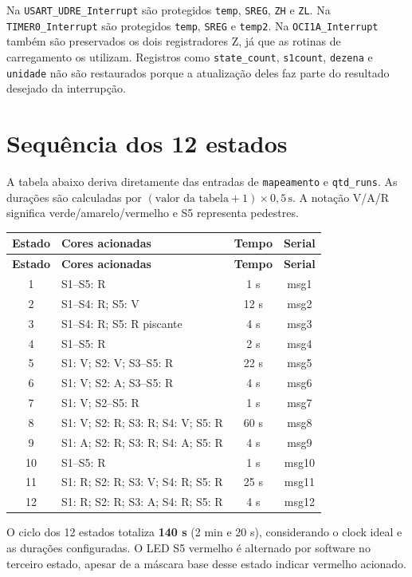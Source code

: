 \documentclass[12pt,a4paper]{article}
\newcommand{\reg}[1]{\texttt{#1}}
\begin{document}
Na \reg{USART\_UDRE\_Interrupt} são protegidos \reg{temp}, \reg{SREG}, \reg{ZH} e \reg{ZL}. Na \reg{TIMER0\_Interrupt} são protegidos \reg{temp}, \reg{SREG} e \reg{temp2}. Na \reg{OCI1A\_Interrupt} também são preservados os dois registradores Z, já que as rotinas de carregamento os utilizam. Registros como \reg{state\_count}, \reg{s1count}, \reg{dezena} e \reg{unidade} não são restaurados porque a atualização deles faz parte do resultado desejado da interrupção.

\section{Sequência dos 12 estados}
A tabela abaixo deriva diretamente das entradas de \reg{mapeamento} e \reg{qtd\_runs}. As durações são calculadas por \((\text{valor da tabela}+1)\times0{,}5\,\mathrm{s}\). A notação V/A/R significa verde/amarelo/vermelho e S5 representa pedestres.
\small
\begin{longtable}{|c|>{\raggedright\arraybackslash}p{7.1cm}|c|c|}
\hline \textbf{Estado} & \textbf{Cores acionadas} & \textbf{Tempo} & \textbf{Serial}\\\hline
\endfirsthead
\hline \textbf{Estado} & \textbf{Cores acionadas} & \textbf{Tempo} & \textbf{Serial}\\\hline
\endhead
1 & S1--S5: R & 1 s & msg1 \\\hline
2 & S1--S4: R; S5: V & 12 s & msg2 \\\hline
3 & S1--S4: R; S5: R piscante & 4 s & msg3 \\\hline
4 & S1--S5: R & 2 s & msg4 \\\hline
5 & S1: V; S2: V; S3--S5: R & 22 s & msg5 \\\hline
6 & S1: V; S2: A; S3--S5: R & 4 s & msg6 \\\hline
7 & S1: V; S2--S5: R & 1 s & msg7 \\\hline
8 & S1: V; S2: R; S3: R; S4: V; S5: R & 60 s & msg8 \\\hline
9 & S1: A; S2: R; S3: R; S4: A; S5: R & 4 s & msg9 \\\hline
10 & S1--S5: R & 1 s & msg10 \\\hline
11 & S1: R; S2: R; S3: V; S4: R; S5: R & 25 s & msg11 \\\hline
12 & S1: R; S2: R; S3: A; S4: R; S5: R & 4 s & msg12 \\\hline
\end{longtable}
\normalsize
O ciclo dos 12 estados totaliza \textbf{140 s} (2 min e 20 s), considerando o clock ideal e as durações configuradas. O LED S5 vermelho é alternado por software no terceiro estado, apesar de a máscara base desse estado indicar vermelho acionado.
\end{document}
